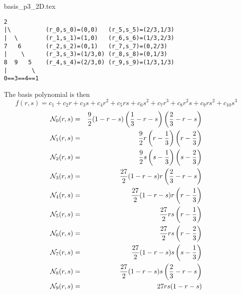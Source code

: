 \begin{flushright} {\tiny {\color{gray} basis\_p3\_2D.tex}} \end{flushright}

\begin{verbatim}
2
|\          (r_0,s_0)=(0,0)   (r_5,s_5)=(2/3,1/3)
|  \        (r_1,s_1)=(1,0)   (r_6,s_6)=(1/3,2/3)
7   6       (r_2,s_2)=(0,1)   (r_7,s_7)=(0,2/3)
|    \      (r_3,s_3)=(1/3,0) (r_8,s_8)=(0,1/3)
8  9   5    (r_4,s_4)=(2/3,0) (r_9,s_9)=(1/3,1/3)
|       \ 
0==3==4==1
\end{verbatim}
The basis polynomial is then
\[
f(r,s) = c_1 + c_2r + c_3s + c_4 r^2 + c_5 rs + c_6 s^2 + c_7 r^3 +c_8 r^2s + c_9 rs^2 + c_{10}s^3
\]
\begin{eqnarray}
{\mathcal{N}}_0(r,s) &=& \frac{9}{2}(1-r-s)\left(\frac13-r-s\right)\left(\frac23-r-s\right) \\
{\mathcal{N}}_1(r,s) &=& \frac{9}{2}r\left(r-\frac13\right)\left(r-\frac23 \right) \\
{\mathcal{N}}_2(r,s) &=& \frac{9}{2}s\left(s-\frac13\right)\left(s-\frac23\right) \\
{\mathcal{N}}_3(r,s) &=& \frac{27}{2}(1-r-s)r \left(\frac23-r-s\right) \\
{\mathcal{N}}_4(r,s) &=& \frac{27}{2}(1-r-s)r\left(r-\frac13\right) \\
{\mathcal{N}}_5(r,s) &=& \frac{27}{2}rs\left(r-\frac13\right) \\
{\mathcal{N}}_6(r,s) &=& \frac{27}{2}rs\left(r-\frac23\right) \\
{\mathcal{N}}_7(r,s) &=& \frac{27}{2}(1-r-s)s\left(s-\frac13\right) \\
{\mathcal{N}}_8(r,s) &=& \frac{27}{2}(1-r-s)s \left(\frac23-r-s\right) \\
{\mathcal{N}}_9(r,s) &=& 27 rs(1-r-s)
\end{eqnarray}

